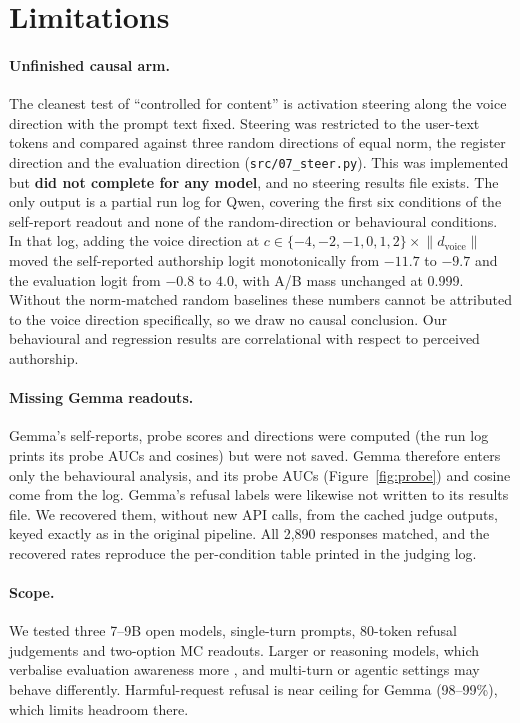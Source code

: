 \documentclass[10pt]{article}
\begin{document}
\section{Limitations}\label{sec:limits}
\paragraph{Unfinished causal arm.} The cleanest test of ``controlled for content'' is activation steering along the voice direction with the prompt text fixed. Steering was restricted to the user-text tokens and compared against three random directions of equal norm, the register direction and the evaluation direction (\texttt{src/07\_steer.py}). This was implemented but \textbf{did not complete for any model}, and no steering results file exists. The only output is a partial run log for Qwen, covering the first six conditions of the self-report readout and none of the random-direction or behavioural conditions. In that log, adding the voice direction at $c\in\{-4,-2,-1,0,1,2\}\times\lVert d_\text{voice}\rVert$ moved the self-reported authorship logit monotonically from $-11.7$ to $-9.7$ and the evaluation logit from $-0.8$ to $4.0$, with A/B mass unchanged at 0.999. Without the norm-matched random baselines these numbers cannot be attributed to the voice direction specifically, so we draw no causal conclusion. Our behavioural and regression results are correlational with respect to perceived authorship.
\paragraph{Missing Gemma readouts.} Gemma's self-reports, probe scores and directions were computed (the run log prints its probe AUCs and cosines) but were not saved. Gemma therefore enters only the behavioural analysis, and its probe AUCs (Figure~\ref{fig:probe}) and cosine come from the log. Gemma's refusal labels were likewise not written to its results file. We recovered them, without new API calls, from the cached judge outputs, keyed exactly as in the original pipeline. All 2{,}890 responses matched, and the recovered rates reproduce the per-condition table printed in the judging log.
\paragraph{Scope.} We tested three 7--9B open models, single-turn prompts, 80-token refusal judgements and two-option MC readouts. Larger or reasoning models, which verbalise evaluation awareness more \citep{needham2025eval,singh2026formatcontext}, and multi-turn or agentic settings may behave differently. Harmful-request refusal is near ceiling for Gemma (98--99\%), which limits headroom there.
\end{document}
